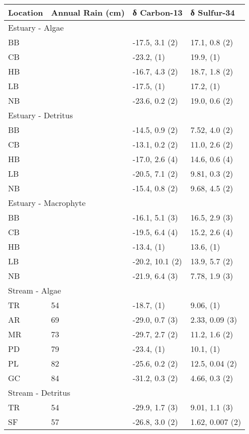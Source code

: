 \documentclass[
]{article}
\begin{document}
\begin{longtable}{llll}
\toprule
Location & Annual Rain (cm) & δ Carbon-13 & δ Sulfur-34 \\ 
\midrule
\multicolumn{4}{l}{Estuary - Algae} \\ 
\midrule
BB &  & -17.5, 3.1 (2) & 17.1, 0.8 (2) \\ 
CB &  & -23.2,     (1) & 19.9,     (1) \\ 
HB &  & -16.7, 4.3 (2) & 18.7, 1.8 (2) \\ 
LB &  & -17.5,     (1) & 17.2,     (1) \\ 
NB &  & -23.6, 0.2 (2) & 19.0, 0.6 (2) \\ 
\midrule
\multicolumn{4}{l}{Estuary - Detritus} \\ 
\midrule
BB &  & -14.5, 0.9 (2) & 7.52, 4.0 (2) \\ 
CB &  & -13.1, 0.2 (2) & 11.0, 2.6 (2) \\ 
HB &  & -17.0, 2.6 (4) & 14.6, 0.6 (4) \\ 
LB &  & -20.5, 7.1 (2) & 9.81, 0.3 (2) \\ 
NB &  & -15.4, 0.8 (2) & 9.68, 4.5 (2) \\ 
\midrule
\multicolumn{4}{l}{Estuary - Macrophyte} \\ 
\midrule
BB &  & -16.1, 5.1 (3) & 16.5, 2.9 (3) \\ 
CB &  & -19.5, 6.4 (4) & 15.2, 2.6 (4) \\ 
HB &  & -13.4,     (1) & 13.6,     (1) \\ 
LB &  & -20.2, 10.1 (2) & 13.9, 5.7 (2) \\ 
NB &  & -21.9, 6.4 (3) & 7.78, 1.9 (3) \\ 
\midrule
\multicolumn{4}{l}{Stream - Algae} \\ 
\midrule
TR & 54 & -18.7,     (1) & 9.06,     (1) \\ 
AR & 69 & -29.0, 0.7 (3) & 2.33, 0.09 (3) \\ 
MR & 73 & -29.7, 2.7 (2) & 11.2, 1.6 (2) \\ 
PD & 79 & -23.4,     (1) & 10.1,     (1) \\ 
PL & 82 & -25.6, 0.2 (2) & 12.5, 0.04 (2) \\ 
GC & 84 & -31.2, 0.3 (2) & 4.66, 0.3 (2) \\ 
\midrule
\multicolumn{4}{l}{Stream - Detritus} \\ 
\midrule
TR & 54 & -29.9, 1.7 (3) & 9.01, 1.1 (3) \\ 
SF & 57 & -26.8, 3.0 (2) & 1.62, 0.007 (2) \\ 

\end{longtable}
\end{document}
